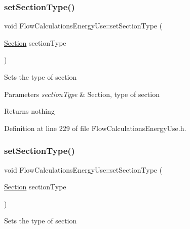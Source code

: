 \subsubsection{\texorpdfstring{set\+Section\+Type()}{setSectionType()}\hspace{0.1cm}{\footnotesize\ttfamily [1/3]}}
{\footnotesize\ttfamily void Flow\+Calculations\+Energy\+Use\+::set\+Section\+Type (\begin{DoxyParamCaption}\item[{\hyperlink{class_flow_calculations_energy_use_afbabab0da698748de91369a5dfc7662a}{Section}}]{section\+Type }\end{DoxyParamCaption})\hspace{0.3cm}{\ttfamily [inline]}}

Sets the type of section


\begin{DoxyParams}{Parameters}
{\em section\+Type} & Section, type of section\\
\hline
\end{DoxyParams}
\begin{DoxyReturn}{Returns}
nothing 
\end{DoxyReturn}


Definition at line 229 of file Flow\+Calculations\+Energy\+Use.\+h.

\mbox{\label{class_flow_calculations_energy_use_add93257048914dbd920b6dc2be431b69}} 
\subsubsection{\texorpdfstring{set\+Section\+Type()}{setSectionType()}\hspace{0.1cm}{\footnotesize\ttfamily [2/3]}}
{\footnotesize\ttfamily void Flow\+Calculations\+Energy\+Use\+::set\+Section\+Type (\begin{DoxyParamCaption}\item[{\hyperlink{class_flow_calculations_energy_use_afbabab0da698748de91369a5dfc7662a}{Section}}]{section\+Type }\end{DoxyParamCaption})\hspace{0.3cm}{\ttfamily [inline]}}

Sets the type of section


